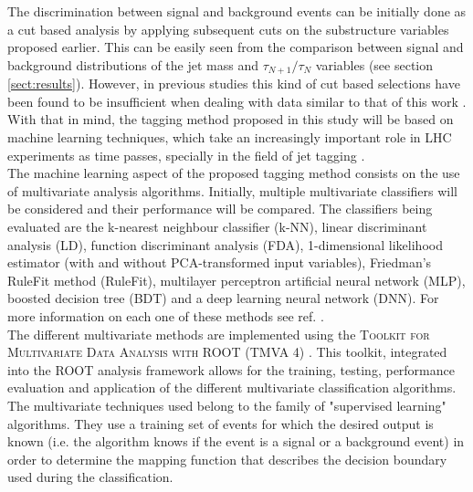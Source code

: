 \documentclass[main]{subfiles} %
\begin{document}
The discrimination between signal and background events can be initially done as a cut based analysis by applying subsequent cuts on the substructure variables proposed earlier. This can be easily seen from the comparison between signal and background distributions of the jet mass and $\tau_{N+1}/\tau_N$ variables (see section \ref{sect:results}). However, in previous studies this kind of cut based selections have been found to be insufficient when dealing with data similar to that of this work \cite{Li2016}. With that in mind, the tagging method proposed in this study will be based on machine learning techniques, which take an increasingly important role in LHC experiments as time passes, specially in the field of jet tagging \cite{Cagnotta2022}.  \\

The machine learning aspect of the proposed tagging method consists on the use of multivariate analysis algorithms. Initially, multiple multivariate classifiers will be considered and their performance will be compared. The classifiers being evaluated are the k-nearest neighbour classifier (k-NN), linear discriminant analysis (LD), function discriminant analysis (FDA), 1-dimensional likelihood estimator (with and without PCA-transformed input variables), Friedman's RuleFit method (RuleFit), multilayer perceptron artificial neural network (MLP), boosted decision tree (BDT) and a deep learning neural network (DNN). For more information on each one of these methods see ref. \cite{Hoecker2009}.\\

The different multivariate methods are implemented using the \textsc{Toolkit for Multivariate Data Analysis with ROOT (\textsc{TMVA 4})} \cite{Hoecker2009}. This toolkit, integrated into the \textsc{ROOT} analysis framework \cite{Brun1997} allows for the training, testing, performance evaluation and application of the different multivariate classification algorithms. The multivariate techniques used belong to the family of "supervised learning" algorithms. They use a training set of events for which the desired output is known (i.e. the algorithm knows if the event is a signal or a background event) in order to determine the mapping function that describes the decision boundary used during the classification. \\
\end{document}
